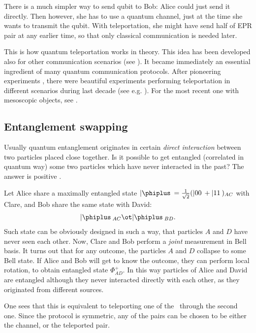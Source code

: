 \documentclass[rmp,12pt,preprint]{revtex4-2}
\begin{document}
There is a much simpler way to send qubit to Bob: Alice could just
send it directly. Then however, she has to use a quantum channel, just
at the time she wants to transmit the qubit. With teleportation, she
might have send half of EPR pair at any earlier time, so that only
classical communication is needed later.

This is how quantum teleportation works in theory. This idea has been
developed also for other communication scenarios (see
\cite{DurCirac-telep}). It became immediately an essential ingredient
of many quantum communication protocols. After pioneering experiments
\cite{Rzym-teleportation,Wieden-teleportation, Kimble-teleportation},
there were beautiful experiments performing teleportation in different
scenarios during last decade (see
e.g. \cite{13,Riebe-telep2004,Nielsen-telep1998,Barrett-telep2004,Ursin-telep2004}).
For the most recent one with mesoscopic objects, see
\cite{Polzik2006-foton-atom}.



\subsection{Entanglement swapping}
\label{subsec:Swapping}

Usually quantum entanglement originates in certain {\it direct
  interaction} between two particles placed close together. Is it
possible to get entangled (correlated in quantum way) some two
particles which have never interacted in the past? The answer is
positive \cite{YurkeStoller_ent_swapping,Teleportation,ent_swapping}.

Let Alice share a maximally entangled state $|\phiplus\> = {1\over
  {\sqrt 2}}(|00\> + |11\>)_{AC}$ with Clare, and Bob share the same state
with David:
\begin{equation}
|\phiplus\>_{AC}\ot|\phiplus\>_{BD}.
\end{equation}
Such state can be obviously designed in such a way, that particles $A$
and $D$ have never seen each other. Now, Clare and Bob perform a {\it
  joint} measurement in Bell basis. It turns out that for any outcome,
the particles $A$ and $D$ collapse to some Bell state. If Alice and
Bob will get to know the outcome, they can perform local rotation, to
obtain entangled state $\Phi^+_{AD}$.  In this way particles of Alice
and David are entangled although they never interacted directly with
each other, as they originated from different sources.

One sees that this is equivalent to teleporting one of the \eprpair\
through the second one. Since the protocol is symmetric, any of the
pairs can be chosen to be either the channel, or the teleported pair.
\end{document}
